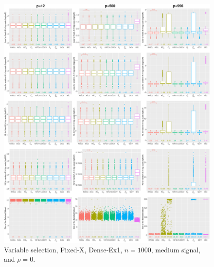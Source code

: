 \begin{figure}[!ht]
\centering
\includegraphics[width=\textwidth]{figures/supplement/fixedx/subset_selection/Dense-Ex1_n1000_msnr_rho0.eps}
\caption{Variable selection, Fixed-X, Dense-Ex1, $n=1000$, medium signal, and $\rho=0$.}
\end{figure}
\clearpage
